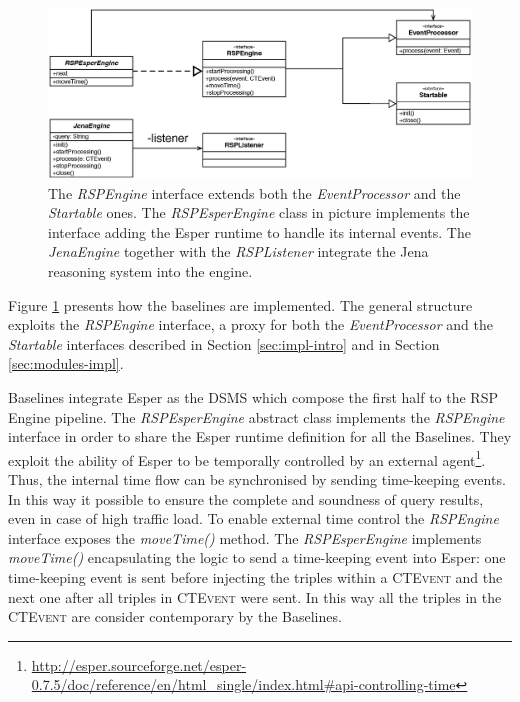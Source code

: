 \begin{figure}[tbh]
  \centering
	\includegraphics[width=\linewidth]{images/uml_baselines_general}
	\caption[\textit{RSPEngine} Implementation Trough Esper and Jena - UML Schema]{The \textit{RSPEngine} interface extends both the \textit{EventProcessor} and the \textit{Startable} ones. The \textit{RSPEsperEngine} class in picture implements the interface adding the Esper runtime to handle its internal events. The \textit{JenaEngine} together with the \textit{RSPListener} integrate the Jena reasoning system into the engine.}
  	\label{fig:uml_baselines_general}
\end{figure}

\noindent Figure \ref{fig:uml_baselines_general} presents how the baselines are implemented. The general structure exploits the \textit{RSPEngine} interface, a proxy for both the \textit{EventProcessor} and the \textit{Startable} interfaces described in Section \ref{sec:impl-intro} and in Section \ref{sec:modules-impl}. 

\name Baselines integrate Esper as the DSMS which compose the first half to the RSP Engine pipeline.  The \textit{RSPEsperEngine} abstract class implements the \textit{RSPEngine} interface in order to share the Esper runtime definition for all the Baselines.  They exploit the ability of Esper to be temporally controlled by an external agent\footnote{\url{http://esper.sourceforge.net/esper-0.7.5/doc/reference/en/html_single/index.html#api-controlling-time}}. Thus, the internal time flow can be synchronised by sending time-keeping events. In this way it possible to ensure the complete and soundness of query results, even in case of high traffic load. To enable external time control the \textit{RSPEngine} interface exposes the \textit{moveTime()} method.  The \textit{RSPEsperEngine} implements \textit{moveTime()} encapsulating the logic to send a time-keeping event into Esper: one time-keeping event is sent before injecting the triples within a \textsc{CTEvent} and the next one after all triples in \textsc{CTEvent} were sent. In this way all the triples in the \textsc{CTEvent} are consider contemporary by the Baselines. 

